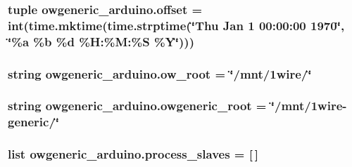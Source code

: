 \hypertarget{namespaceowgeneric__arduino_a30145d36e9de440b44c360e2c295e4aa}{
\subsubsection[{offset}]{\setlength{\rightskip}{0pt plus 5cm}tuple owgeneric\-\_\-arduino.\-offset = int(time.\-mktime(time.\-strptime(\char`\"{}Thu Jan 1 00\-:00\-:00 1970\char`\"{}, \char`\"{}\%a \%{\bf b} \%{\bf d} \%H\-:\%M\-:\%S \%{\bf Y}\char`\"{})))}}\label{namespaceowgeneric__arduino_a30145d36e9de440b44c360e2c295e4aa}
\hypertarget{namespaceowgeneric__arduino_acf1b83c6bfca7dce8e079086078b19b9}{
\subsubsection[{ow\-\_\-root}]{\setlength{\rightskip}{0pt plus 5cm}string owgeneric\-\_\-arduino.\-ow\-\_\-root = \char`\"{}/mnt/1wire/\char`\"{}}}\label{namespaceowgeneric__arduino_acf1b83c6bfca7dce8e079086078b19b9}
\hypertarget{namespaceowgeneric__arduino_a55174673236c57dac9b691a2f5b49b69}{
\subsubsection[{owgeneric\-\_\-root}]{\setlength{\rightskip}{0pt plus 5cm}string owgeneric\-\_\-arduino.\-owgeneric\-\_\-root = \char`\"{}/mnt/1wire-\/generic/\char`\"{}}}\label{namespaceowgeneric__arduino_a55174673236c57dac9b691a2f5b49b69}
\hypertarget{namespaceowgeneric__arduino_a88e87453974fbe548a91bf0884be4ad3}{
\subsubsection[{process\-\_\-slaves}]{\setlength{\rightskip}{0pt plus 5cm}list owgeneric\-\_\-arduino.\-process\-\_\-slaves = \mbox{[}$\,$\mbox{]}}}\label{namespaceowgeneric__arduino_a88e87453974fbe548a91bf0884be4ad3}
